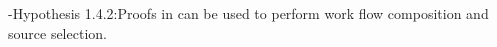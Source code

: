 \hyp{Hypothesis 1.4.2:}{Proofs in \nthree can be used to perform work flow composition and source selection.} 









% 
% 

% 

% 
% 
% 

% 
% 


